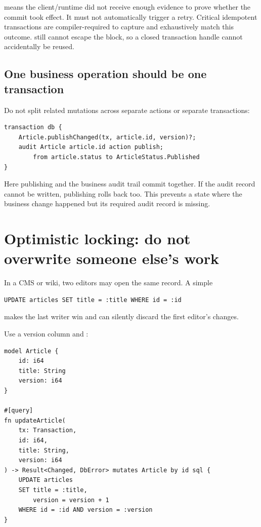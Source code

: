  means the client/runtime did not receive enough evidence to prove whether the commit took effect. It must not automatically trigger a retry. Critical idempotent transactions are compiler-required to capture and exhaustively match this outcome.  still cannot escape the block, so a closed transaction handle cannot accidentally be reused.

\subsection*{One business operation should be one transaction}

Do not split related mutations across separate actions or separate transactions:

\begin{lstlisting}[language=Velran]
transaction db {
    Article.publishChanged(tx, article.id, version)?;
    audit Article article.id action publish;
        from article.status to ArticleStatus.Published
}
\end{lstlisting}

Here publishing and the business audit trail commit together. If the audit record cannot be written, publishing rolls back too. This prevents a state where the business change happened but its required audit record is missing.

\section{Optimistic locking: do not overwrite someone else's work}

In a CMS or wiki, two editors may open the same record. A simple

\begin{lstlisting}
UPDATE articles SET title = :title WHERE id = :id
\end{lstlisting}

makes the last writer win and can silently discard the first editor's changes.

Use a version column and :

\begin{lstlisting}[language=Velran]
model Article {
    id: i64
    title: String
    version: i64
}

#[query]
fn updateArticle(
    tx: Transaction,
    id: i64,
    title: String,
    version: i64
) -> Result<Changed, DbError> mutates Article by id sql {
    UPDATE articles
    SET title = :title,
        version = version + 1
    WHERE id = :id AND version = :version
}
\end{lstlisting}

